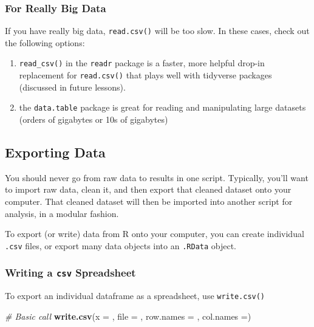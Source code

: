 \documentclass[]{book}
\newenvironment{Shaded}{\begin{snugshade}}{\end{snugshade}}
\newcommand{\KeywordTok}[1]{\textcolor[rgb]{0.13,0.29,0.53}{\textbf{#1}}}
\newcommand{\DataTypeTok}[1]{\textcolor[rgb]{0.13,0.29,0.53}{#1}}
\newcommand{\CommentTok}[1]{\textcolor[rgb]{0.56,0.35,0.01}{\textit{#1}}}
\newcommand{\NormalTok}[1]{#1}
\providecommand{\tightlist}{%
  \setlength{\itemsep}{0pt}\setlength{\parskip}{0pt}}
\begin{document}
\subsubsection*{For Really Big Data}\label{for-really-big-data}

If you have really big data, \texttt{read.csv()} will be too slow. In
these cases, check out the following options:

\begin{enumerate}
\def\labelenumi{\arabic{enumi})}
\tightlist
\item
  \texttt{read\_csv()} in the \texttt{readr} package is a faster, more
  helpful drop-in replacement for \texttt{read.csv()} that plays well
  with tidyverse packages (discussed in future lessons).
\item
  the \texttt{data.table} package is great for reading and manipulating
  large datasets (orders of gigabytes or 10s of gigabytes)
\end{enumerate}

\subsection{Exporting Data}\label{exporting-data}

You should never go from raw data to results in one script. Typically,
you'll want to import raw data, clean it, and then export that cleaned
dataset onto your computer. That cleaned dataset will then be imported
into another script for analysis, in a modular fashion.

To export (or write) data from R onto your computer, you can create
individual \texttt{.csv} files, or export many data objects into an
\texttt{.RData} object.

\subsubsection*{\texorpdfstring{Writing a \texttt{csv}
Spreadsheet}{Writing a csv Spreadsheet}}\label{writing-a-csv-spreadsheet}

To export an individual dataframe as a spreadsheet, use
\texttt{write.csv()}

\begin{Shaded}
\begin{Highlighting}[]
\CommentTok{# Basic call}
\KeywordTok{write.csv}\NormalTok{(}\DataTypeTok{x =}\NormalTok{ , }\DataTypeTok{file =}\NormalTok{ , }\DataTypeTok{row.names =}\NormalTok{ , }\DataTypeTok{col.names =}\NormalTok{)}
\end{Highlighting}
\end{Shaded}
\end{document}
